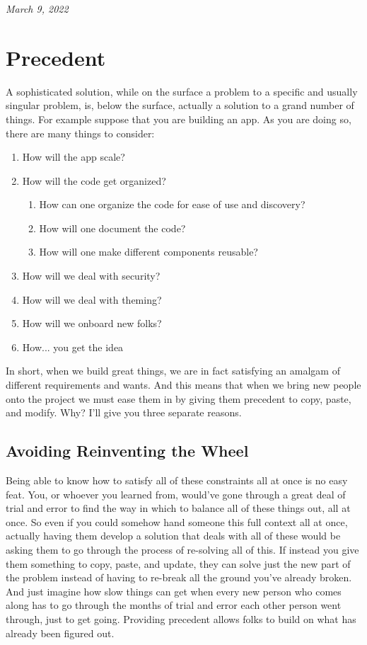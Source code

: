 \documentclass[10pt,a5paper]{book}
\begin{document}
\textit{March 9, 2022}

\section{Precedent}
A sophisticated solution, while on the surface a problem to a specific and usually singular problem, is, below the surface, actually a solution to a grand number of things. For example suppose that you are building an app. As you are doing so, there are many things to consider:

\begin{enumerate}
\item How will the app scale?
\item How will the code get organized?
\begin{enumerate}
\item How can one organize the code for ease of use and discovery?
\item How will one document the code?
\item How will one make different components reusable?
\end{enumerate}

\item How will we deal with security?
\item How will we deal with theming?
\item How will we onboard new folks?
\item How... you get the idea
\end{enumerate}

In short, when we build great things, we are in fact satisfying an amalgam of different requirements and wants. And this means that when we bring new people onto the project we must ease them in by giving them precedent to copy, paste, and modify. Why? I'll give you three separate reasons.

\subsection{Avoiding Reinventing the Wheel}
Being able to know how to satisfy all of these constraints all at once is no easy feat. You, or whoever you learned from, would've gone through a great deal of trial and error to find the way in which to balance all of these things out, all at once. So even if you could somehow hand someone this full context all at once, actually having them develop a solution that deals with all of these would be asking them to go through the process of re-solving all of this. If instead you give them something to copy, paste, and update, they can solve just the new part of the problem instead of having to re-break all the ground you've already broken. And just imagine how slow things can get when every new person who comes along has to go through the months of trial and error each other person went through, just to get going. Providing precedent allows folks to build on what has already been figured out.
\end{document}
